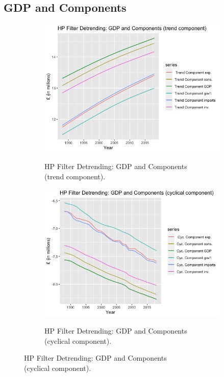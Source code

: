 \documentclass[12pt]{article}
\begin{document}
\newpage

\subsection{GDP and Components}

\begin{figure}[h!]
\centering
\begin{subfigure}{.5\textwidth}
  \centering
\includegraphics[scale=0.45]{hp1.png}
\label{}
\caption{HP Filter Detrending: GDP and Components \\ (trend component).}
\end{subfigure}%
\begin{subfigure}{.5\textwidth}
\centering
\includegraphics[scale=0.45]{hp3.png}
\label{}
\caption{HP Filter Detrending: GDP and Components \\ (cyclical component).}
\end{subfigure}
\end{figure}
\end{document}
